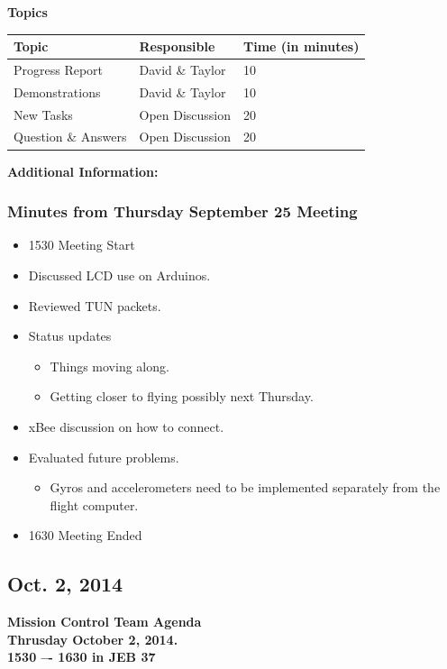 \documentclass[pdftex,11pt]{article}
\begin{document}
{ \large \bfseries \noindent Topics}
\vspace*{2.5mm}

\begin{tabular}{| l | l | l |}
  \hline
  \bfseries Topic & \bfseries Responsible & \bfseries Time (in minutes) \\ \hline
  Progress Report  & David \& Taylor &  10 \\ \hline
  Demonstrations & David \& Taylor & 10 \\ \hline
  New Tasks & Open Discussion & 20 \\ \hline
  Question \&  Answers  & Open Discussion & 20 \\ 
  \hline
\end{tabular}

\vspace*{2.5mm}
{ \large \bfseries \noindent Additional Information:}

\subsubsection[short]{Minutes from Thursday September 25 Meeting}
\begin{itemize}
	\item 1530 \indent Meeting Start
	\item Discussed LCD use on Arduinos.
	\item Reviewed TUN  packets.
	\item  Status updates
	\begin{itemize}
		\item Things moving along.
		\item Getting closer to flying possibly  next Thursday.
	\end{itemize}
	\item xBee discussion on how to connect.
	\item Evaluated future problems.
	\begin{itemize}
		\item  Gyros and accelerometers need to be implemented separately from the flight computer.
	\end{itemize}
	\item 1630 \indent Meeting Ended
\end{itemize}	

\clearpage


\subsection{Oct. 2, 2014}
{ \huge \bfseries Mission Control Team Agenda \\[0.4cm] }
{ \huge \bfseries Thrusday October 2, 2014.\\1530 –-  1630  in JEB 37\\[0.4cm] }
\vspace*{2.5mm}
\end{document}
